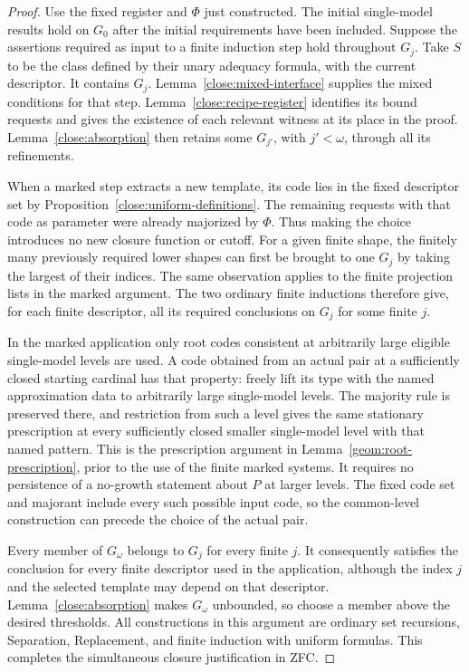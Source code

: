 \begin{proof}
Use the fixed register and $\Phi$ just constructed.  The initial
single-model results hold on $G_0$ after the initial requirements have
been included.  Suppose the assertions required as input to a finite
induction step hold throughout $G_j$.  Take $S$ to be the class defined
by their unary adequacy formula, with the current descriptor.  It
contains $G_j$.  Lemma~\ref{close:mixed-interface} supplies the mixed
conditions for that step.  Lemma~\ref{close:recipe-register} identifies
its bound requests and gives the existence of each relevant witness
at its place in the proof.  Lemma~\ref{close:absorption} then retains
some $G_{j'}$, with $j'<\omega$, through all its refinements.

When a marked step extracts a new template, its code lies in the fixed
descriptor set by Proposition~\ref{close:uniform-definitions}.  The
remaining requests with that code as parameter were already majorized
by $\Phi$.  Thus making the choice introduces no new closure function
or cutoff.  For a given finite shape, the finitely many previously
required lower shapes can first be brought to one $G_j$ by taking the
largest of their indices.  The same observation applies to the finite
projection lists in the marked argument.  The two ordinary finite
inductions therefore give, for each finite descriptor, all its required
conclusions on $G_j$ for some finite $j$.

In the marked application only root codes consistent at arbitrarily
large eligible single-model levels are used.  A code obtained from an
actual pair at a sufficiently closed starting cardinal has that property:
freely lift its type with the named approximation data to arbitrarily
large single-model levels.  The majority rule is preserved there, and
restriction from such a level gives the same stationary prescription
at every sufficiently closed smaller single-model level with that
named pattern.  This is the prescription argument in
Lemma~\ref{geom:root-prescription}, prior to the use of the finite marked
systems.  It requires no persistence of a no-growth statement about
$P$ at larger levels.  The fixed code set and majorant include every
such possible input code, so the common-level construction can precede
the choice of the actual pair.

Every member of $G_\omega$ belongs to $G_j$ for every finite $j$.  It consequently
satisfies the conclusion for every finite descriptor used in the
application, although the index $j$ and the selected template may depend
on that descriptor.  Lemma~\ref{close:absorption} makes $G_\omega$
unbounded, so choose a member above the desired thresholds.  All
constructions in this argument are ordinary set recursions, Separation,
Replacement, and finite induction with uniform formulas.  This completes
the simultaneous closure justification in ZFC.
\end{proof}

